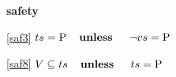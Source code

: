 \textbf{safety}
\begin{block}
\item[ \eqref{saf3} ]{$ts = \text{P}  \textbf{\quad unless \quad} \neg vs = \text{P} $} %
\item[ \eqref{saf8} ]{$V \subseteq ts  \textbf{\quad unless \quad} ts = \text{P} $} %
\end{block}

